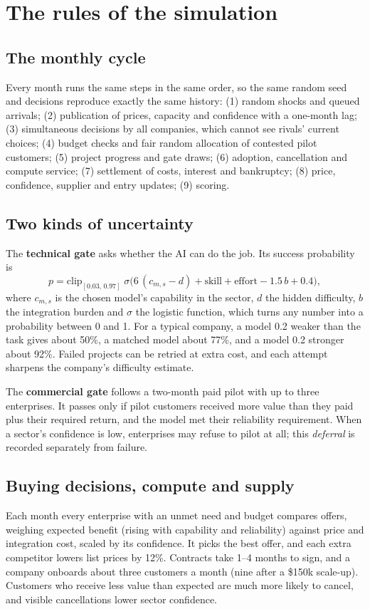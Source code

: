 \documentclass[11pt]{article}
\begin{document}
\section{The rules of the simulation}
\label{sec:rules}

\subsection{The monthly cycle}
Every month runs the same steps in the same order, so the same random seed and decisions reproduce exactly the same history: (1) random shocks and queued arrivals; (2) publication of prices, capacity and confidence with a one-month lag; (3) simultaneous decisions by all companies, which cannot see rivals' current choices; (4) budget checks and fair random allocation of contested pilot customers; (5) project progress and gate draws; (6) adoption, cancellation and compute service; (7) settlement of costs, interest and bankruptcy; (8) price, confidence, supplier and entry updates; (9) scoring.

\subsection{Two kinds of uncertainty}
The \textbf{technical gate} asks whether the AI can do the job. Its success probability is
\begin{equation}
p = \mathrm{clip}_{[0.03,\,0.97]}\;\sigma\!\big(6\,(c_{m,s} - d) + \text{skill} + \text{effort} - 1.5\,b + 0.4\big),
\end{equation}
where $c_{m,s}$ is the chosen model's capability in the sector, $d$ the hidden difficulty, $b$ the integration burden and $\sigma$ the logistic function, which turns any number into a probability between 0 and 1. For a typical company, a model 0.2 weaker than the task gives about 50\%, a matched model about 77\%, and a model 0.2 stronger about 92\%. Failed projects can be retried at extra cost, and each attempt sharpens the company's difficulty estimate.

The \textbf{commercial gate} follows a two-month paid pilot with up to three enterprises. It passes only if pilot customers received more value than they paid plus their required return, and the model met their reliability requirement. When a sector's confidence is low, enterprises may refuse to pilot at all; this \emph{deferral} is recorded separately from failure.

\subsection{Buying decisions, compute and supply}
Each month every enterprise with an unmet need and budget compares offers, weighing expected benefit (rising with capability and reliability) against price and integration cost, scaled by its confidence. It picks the best offer, and each extra competitor lowers list prices by 12\%. Contracts take 1--4 months to sign, and a company onboards about three customers a month (nine after a \$150k scale-up). Customers who receive less value than expected are much more likely to cancel, and visible cancellations lower sector confidence.
\end{document}
